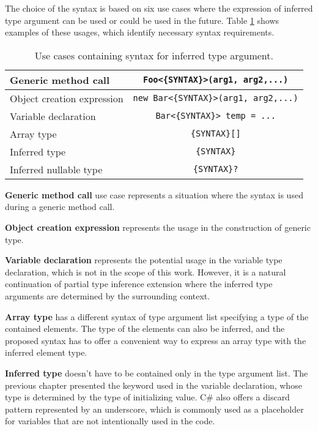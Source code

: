 The choice of the syntax is based on six use cases where the expression of inferred type argument can be used or could be used in the future. 
Table \ref{table2:useCasesChar} shows examples of these usages, which identify necessary syntax requirements.
\begin{table}[h]
\begin{center}
\begin{tabular}{ | l | c | } 
  \hline
  Generic method call & \texttt{Foo<\{SYNTAX\}>(arg1, arg2,...)}\\
  \hline
  Object creation expression & \texttt{new Bar<\{SYNTAX\}>(arg1, arg2,...)}\\
  \hline
  Variable declaration & \texttt{Bar<\{SYNTAX\}> temp = ...}\\
  \hline
  Array type & \texttt{\{SYNTAX\}[]}\\
  \hline
  Inferred type & \texttt{\{SYNTAX\}}\\
  \hline
  Inferred nullable type & \texttt{\{SYNTAX\}?}\\
  \hline
\end{tabular}
\end{center}
\caption{Use cases containing syntax for inferred type argument.}
\label{table2:useCasesChar}
\end{table}
\par
\textbf{Generic method call} use case represents a situation where the syntax is used during a generic method call.
\par
\textbf{Object creation expression} represents the usage in the construction of generic type.
\par
\textbf{Variable declaration} represents the potential usage in the variable type declaration, which is not in the scope of this work. 
However, it is a natural continuation of partial type inference extension where the inferred type arguments are determined by the surrounding context.
\par
\textbf{Array type} has a different syntax of type argument list specifying a type of the contained elements. 
The type of the elements can also be inferred, and the proposed syntax has to offer a convenient way to express an array type with the inferred element type.
\par
\textbf{Inferred type} doesn’t have to be contained only in the type argument list.
The previous chapter presented the  keyword used in the variable declaration, whose type is determined by the type of initializing value. 
C\# also offers a discard pattern \cite{online:discard} represented by an underscore, which is commonly used as a placeholder for variables that are not intentionally used in the code. 
